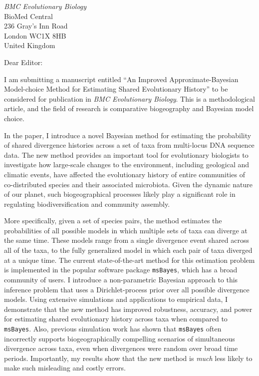 \documentclass[letterpaper,11pt]{letter}
\begin{document}
\begin{letter}{\emph{BMC Evolutionary Biology} \\
                        BioMed Central \\
                        236 Gray's Inn Road \\
                        London WC1X 8HB \\
                        United Kingdom}
\opening{Dear Editor:}
I am submitting a manuscript entitled ``An Improved Approximate-Bayesian
Model-choice Method for Estimating Shared Evolutionary History'' to be
considered for publication in \emph{BMC Evolutionary Biology}.
This is a methodological article, and the field of research is comparative
biogeography and Bayesian model choice.

In the paper, I introduce a novel Bayesian method for estimating the
probability of shared divergence histories across a set of taxa from
multi-locus DNA sequence data.
The new method provides an important tool for evolutionary biologists to
investigate how large-scale changes to the environment, including geological
and climatic events, have affected the evolutionary history of entire
communities of co-distributed species and their associated microbiota.
Given the dynamic nature of our planet, such biogeographical processes likely
play a significant role in regulating biodiversification and community assembly.

More specifically, given a set of species pairs, the method estimates
the probabilities of all possible models in which multiple sets of taxa
can diverge at the same time.
These models range from a single divergence event shared across all of the
taxa, to the fully generalized model in which each pair of taxa diverged at a
unique time.
The current state-of-the-art method for this estimation problem is implemented
in the popular software package \texttt{msBayes}, which has a broad community
of users.
I introduce a non-parametric Bayesian approach to this inference problem that
uses a Dirichlet-process prior over all possible divergence models.
Using extensive simulations and applications to empirical data, I demonstrate
that the new method has improved robustness, accuracy, and power for estimating
shared evolutionary history across taxa when compared to \texttt{msBayes}.
Also, previous simulation work has shown that \texttt{msBayes} often
incorrectly supports biogeographically compelling scenarios of simultaneous
divergence across taxa, even when divergences were random over broad time
periods.
Importantly, my results show that the new method is \emph{much} less likely to
make such misleading and costly errors.


\end{letter}
\end{document}
